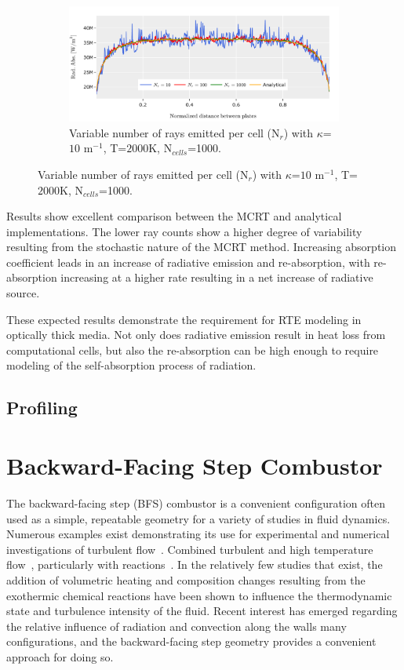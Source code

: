 \begin{figure}
  \begin{subfigure}{1\textwidth}
  \includegraphics[width=\linewidth]{figures/ch4/PPcomparison3.png}
  \caption{Variable number of rays emitted per cell (N$_r$) with $\kappa{}$=$10$ m$^{-1}$, T=$2000$K, N$_{cells}$=1000.}
  \label{fig:PPcom_nrays}
  \end{subfigure}
  \label{fig:PPcomp}
\end{figure}

Results show excellent comparison between the MCRT and analytical implementations. 
The lower ray counts show a higher degree of variability resulting from the stochastic nature of the MCRT method. 
Increasing absorption coefficient leads in an increase of radiative emission and re-absorption, with re-absorption increasing at a higher rate resulting in a net increase of radiative source.

These expected results demonstrate the requirement for RTE modeling in optically thick media. Not only does radiative emission result in heat loss from computational cells, but also the re-absorption can be high enough to require modeling of the self-absorption process of radiation.

\subsection{Profiling}


\section{Backward-Facing Step Combustor}
The backward-facing step (BFS) combustor is a convenient configuration often used as a simple, repeatable geometry for a variety of studies in fluid dynamics.
Numerous examples exist demonstrating its use for experimental and numerical investigations of turbulent flow~\cite{Armaly1983ExperimentalFlow,Neto1993AStep,Jovic1994Backward-facing5000,Le1997DirectStep}. Combined turbulent and high temperature flow~\cite{Niemann2016Buoyancy-affectedNumber,Xie2017GeometrySteps}, particularly with reactions~\cite{Pouech2021PremixedStep}.
In the relatively few studies that exist, the addition of volumetric heating and composition changes resulting from the exothermic chemical reactions have been shown to influence the thermodynamic state and turbulence intensity of the fluid. Recent interest has emerged regarding the relative influence of radiation and convection along the walls many configurations, and the backward-facing step geometry provides a convenient approach for doing so.

